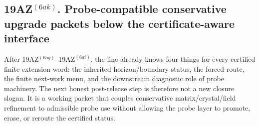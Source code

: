 \subsection*{19AZ$^{(6ak)}$. Probe-compatible conservative upgrade packets below the certificate-aware interface}
\label{sec:probe-compatible-conservative-upgrade-packets-below-the-certificate-aware-interface}
After 19AZ$^{(6ag)}$--19AZ$^{(6ai)}$, the line already knows four things for every certified finite extension word: the inherited horizon/boundary status, the forced route, the finite next-work menu, and the downstream diagnostic role of probe machinery. The next honest post-release step is therefore not a new closure slogan. It is a working packet that couples conservative matrix/crystal/field refinement to admissible probe use without allowing the probe layer to promote, erase, or reroute the certified status.

